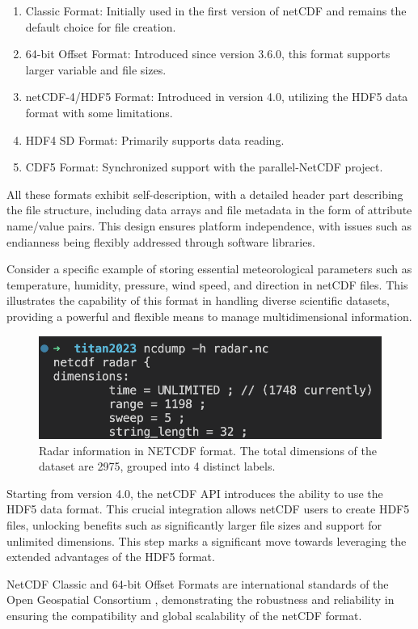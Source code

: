 \begin{enumerate}
    \item Classic Format: Initially used in the first version of netCDF and
    remains the default choice for file creation.
    \item 64-bit Offset Format: Introduced since version 3.6.0, this format
    supports larger variable and file sizes.
    \item netCDF-4/HDF5 Format: Introduced in version 4.0, utilizing the HDF5
    data format with some limitations.
    \item HDF4 SD Format: Primarily supports data reading.
    \item CDF5 Format: Synchronized support with the parallel-NetCDF project.
\end{enumerate}

All these formats exhibit self-description, with a detailed header part
describing the file structure, including data arrays and file metadata in the
form of attribute name/value pairs. This design ensures platform independence,
with issues such as endianness being flexibly addressed through software
libraries.

Consider a specific example of storing essential meteorological parameters such
as temperature, humidity, pressure, wind speed, and direction in netCDF files.
This illustrates the capability of this format in handling diverse scientific
datasets, providing a powerful and flexible means to manage multidimensional
information.

\begin{figure}[H]
    \centering
    \includegraphics[width=1\linewidth]{Images/ncdump.png}
    \vspace{1em}
    \caption{Radar information in NETCDF format. The total dimensions of the dataset are 2975, grouped into 4 distinct labels.}
    \label{fig:enter-label}
\end{figure}

Starting from version 4.0, the netCDF API introduces the ability to use the HDF5
data format. This crucial integration allows netCDF users to create HDF5 files,
unlocking benefits such as significantly larger file sizes and support for
unlimited dimensions. This step marks a significant move towards leveraging the
extended advantages of the HDF5 format.

NetCDF Classic and 64-bit Offset Formats are international standards of the Open
Geospatial Consortium \cite{ogcnetcdf}, demonstrating the robustness and
reliability in ensuring the compatibility and global scalability of the netCDF
format.
